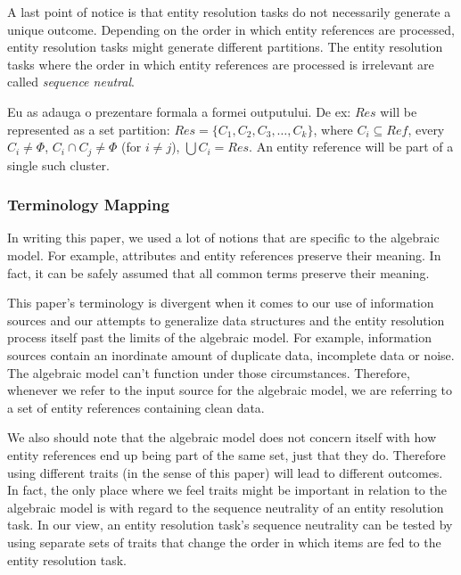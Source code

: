 \documentclass[lettersize,journal]{IEEEtran}
\begin{document}
    A last point of notice is that entity resolution tasks do not necessarily
    generate a unique outcome\cite{Tal11}.
    Depending on the order in which entity references are processed, entity
    resolution tasks might generate different partitions.
    The entity resolution tasks where the order in which entity references are
    processed is irrelevant are called \textit{sequence neutral}\cite{Tal11}.


    Eu as adauga o prezentare formala a formei outputului.
    De ex: $Res$ will be represented as a set partition: $Res = \{C_1, C_2, C_3, \ldots, C_k\}$, where $C_i \subseteq Ref$, every $C_i \neq \Phi$, $C_i \cap C_j \neq \Phi$ (for $i \neq j$), $\bigcup C_i = Res$.
    An entity reference will be part of a single such cluster.


    \subsubsection[algrel]{Terminology Mapping}\label{subsubsec:algrel}

    In writing this paper, we used a lot of notions that are specific to the
    algebraic model.
    For example, attributes and entity references preserve their meaning.
    In fact, it can be safely assumed that all common terms preserve their
    meaning.
    
    This paper's terminology is divergent when it comes to our use of
    information sources and our attempts to generalize data structures and the
    entity resolution process itself past the limits of the algebraic model.
    For example, information sources contain an inordinate amount of duplicate
    data, incomplete data or noise.
    The algebraic model can't function under those circumstances.
    Therefore, whenever we refer to the input source for the algebraic model,
    we are referring to a set of entity references containing clean data.
    
    We also should note that the algebraic model does not concern itself with
    how entity references end up being part of the same set, just that they do.
    Therefore using different traits (in the sense of this paper) will lead to
    different outcomes.
    In fact, the only place where we feel traits might be important in relation
    to the algebraic model is with regard to the sequence neutrality of an
    entity resolution task.
    In our view, an entity resolution task's sequence neutrality can be tested
    by using separate sets of traits that change the order in which items are
    fed to the entity resolution task.
\end{document}

